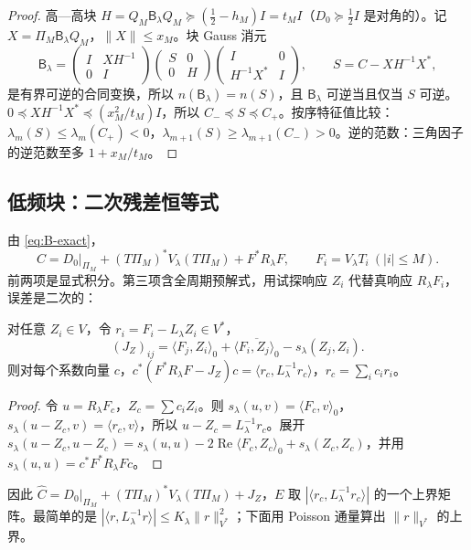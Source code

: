 \documentclass[11pt,a4paper,fontset=fandol]{ctexart}
\begin{document}
\begin{proof}
高—高块 $H=Q_M\mathsf B_\lambda Q_M\succeq(\tfrac12-h_M)I=t_MI$（$D_0\succeq\frac12I$ 是对角的）。记 $X=\Pi_M\mathsf B_\lambda Q_M$，$\|X\|\le x_M$。块 Gauss 消元
\[
\mathsf B_\lambda=\begin{pmatrix}I&XH^{-1}\\0&I\end{pmatrix}\begin{pmatrix}S&0\\0&H\end{pmatrix}\begin{pmatrix}I&0\\H^{-1}X^*&I\end{pmatrix},\qquad S=C-XH^{-1}X^*,
\]
是有界可逆的合同变换，所以 $n(\mathsf B_\lambda)=n(S)$，且 $\mathsf B_\lambda$ 可逆当且仅当 $S$ 可逆。$0\preceq XH^{-1}X^*\preceq(x_M^2/t_M)I$，所以 $C_-\preceq S\preceq C_+$。按序特征值比较：$\lambda_m(S)\le\lambda_m(C_+)<0$，$\lambda_{m+1}(S)\ge\lambda_{m+1}(C_-)>0$。逆的范数：三角因子的逆范数至多 $1+x_M/t_M$。
\end{proof}

\subsection{低频块：二次残差恒等式}

由 \eqref{eq:B-exact}，
\[
C=D_0|_{\Pi_M}+(T\Pi_M)^*V_\lambda(T\Pi_M)+F^*R_\lambda F,\qquad F_i=V_\lambda T_i\ (|i|\le M).
\]
前两项是显式积分。第三项含全周期预解式，用试探响应 $Z_i$ 代替真响应 $R_\lambda F_i$，误差是二次的：

\begin{lemma}[二次残差恒等式]
\label{lem:quad-residual}
对任意 $Z_i\in V$，令 $r_i=F_i-L_\lambda Z_i\in V^*$，
\[
(J_Z)_{ij}=\langle F_j,Z_i\rangle_0+\overline{\langle F_i,Z_j\rangle_0}-s_\lambda(Z_j,Z_i).
\]
则对每个系数向量 $c$，$c^*(F^*R_\lambda F-J_Z)c=\langle r_c,L_\lambda^{-1}r_c\rangle$，$r_c=\sum_ic_ir_i$。
\end{lemma}

\begin{proof}
令 $u=R_\lambda F_c$，$Z_c=\sum c_iZ_i$。则 $s_\lambda(u,v)=\langle F_c,v\rangle_0$，$s_\lambda(u-Z_c,v)=\langle r_c,v\rangle$，所以 $u-Z_c=L_\lambda^{-1}r_c$。展开
$s_\lambda(u-Z_c,u-Z_c)=s_\lambda(u,u)-2\operatorname{Re}\langle F_c,Z_c\rangle_0+s_\lambda(Z_c,Z_c)$，并用 $s_\lambda(u,u)=c^*F^*R_\lambda Fc$。
\end{proof}

因此 $\hat C=D_0|_{\Pi_M}+(T\Pi_M)^*V_\lambda(T\Pi_M)+J_Z$，$E$ 取 $|\langle r_c,L_\lambda^{-1}r_c\rangle|$ 的一个上界矩阵。最简单的是 $|\langle r,L_\lambda^{-1}r\rangle|\le K_\lambda\|r\|_{V^*}^2$；下面用 Poisson 通量算出 $\|r\|_{V^*}$ 的上界。
\end{document}
